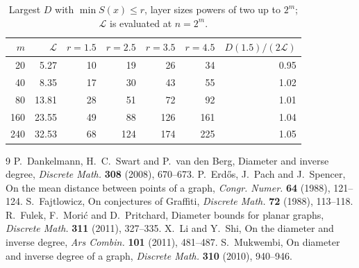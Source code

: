 \documentclass[11pt]{amsart}
\theoremstyle{definition}
\theoremstyle{remark}
\newcommand{\Lz}{\mathcal{L}}
\begin{document}
\begin{table}[ht]
\centering
\caption{Largest $D$ with $\min S(x)\le r$, layer sizes powers of two up to $2^m$; $\Lz$ is evaluated at $n=2^m$.}\label{tab:dp}
\begin{tabular}{@{}rrrrrrr@{}}
\toprule
$m$ & $\Lz$ & $r=1.5$ & $r=2.5$ & $r=3.5$ & $r=4.5$ & $D(1.5)/(2\Lz)$\\
\midrule
20 & 5.27 & 10 & 19 & 26 & 34 & 0.95\\
40 & 8.35 & 17 & 30 & 43 & 55 & 1.02\\
80 & 13.81 & 28 & 51 & 72 & 92 & 1.01\\
160 & 23.55 & 49 & 88 & 126 & 161 & 1.04\\
240 & 32.53 & 68 & 124 & 174 & 225 & 1.05\\
\bottomrule
\end{tabular}
\end{table}

\begin{thebibliography}{9}
 P.~Dankelmann, H.~C.~Swart and P.~van den Berg, Diameter and inverse degree, \emph{Discrete Math.} \textbf{308} (2008), 670--673.
 P.~Erd\H{o}s, J.~Pach and J.~Spencer, On the mean distance between points of a graph, \emph{Congr. Numer.} \textbf{64} (1988), 121--124.
 S.~Fajtlowicz, On conjectures of Graffiti, \emph{Discrete Math.} \textbf{72} (1988), 113--118.
 R.~Fulek, F.~Mori\'c and D.~Pritchard, Diameter bounds for planar graphs, \emph{Discrete Math.} \textbf{311} (2011), 327--335.
 X.~Li and Y.~Shi, On the diameter and inverse degree, \emph{Ars Combin.} \textbf{101} (2011), 481--487.
 S.~Mukwembi, On diameter and inverse degree of a graph, \emph{Discrete Math.} \textbf{310} (2010), 940--946.
\end{thebibliography}
\end{document}
